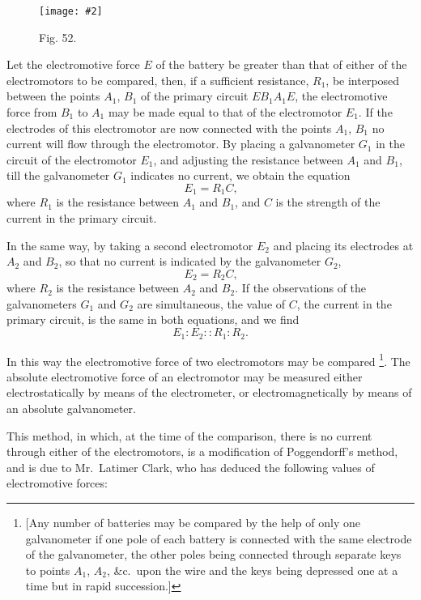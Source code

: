 \documentclass[12pt,oneside]{book}[2021/10/04]
\let\oldfootnote\footnote
\renewcommand\footnote[1]{%
\oldfootnote{\hspace{0.14em}#1}}
\newcommand{\Runhead}[1]{\fancyhead[C]{\iffloatpage{}{\small#1}}}
\newcommand{\widefig}[3]{
\begin{figure}[ht!]
\centering
\texttt{[image: \#2]}
\caption*{\small #3}
\end{figure}}
\newcommand{\¬}{\hphantom{0}}
\begin{document}
\widefig{0.51}{213.png}{Fig. 52.}
Let the electromotive force \(E\) of the battery be greater than that
of either of the electromotors to be compared, then, if a sufficient
resistance, \(R_1\), be interposed between the points \(A_1\), \(B_1\) of the
primary circuit \(EB_1A_1E\), the electromotive force from \(B_1\) to \(A_1\)
may be made equal to that of the electromotor \(E_1\). If the electrodes
of this electromotor are now connected with the points
\(A_1\), \(B_1\) no current will flow through the electromotor. By placing
a galvanometer \(G_1\) in the circuit of the electromotor \(E_1\), and
adjusting the resistance between \(A_1\) and \(B_1\), till the galvanometer
\(G_1\) indicates no current, we obtain the equation
\[
  E_1 = R_1C\text{,}
\]
where \(R_1\) is the resistance between \(A_1\) and \(B_1\), and \(C\) is the strength
of the current in the primary circuit.

In the same way, by taking a second electromotor \(E_2\) and placing
its electrodes at \(A_2\) and \(B_2\), so that no current is indicated by the
galvanometer \(G_2\),
\[
  E_2 = R_2C\text{,}
\]
where \(R_2\) is the resistance between \(A_2\) and \(B_2\). If the observations
of the galvanometers \(G_1\) and \(G_2\) are simultaneous, the value of \(C\),
the current in the primary circuit, is the same in both equations,
and we find
\[
 E_1 : E_2 :: R_1 : R_2\text{.}
\]

In this way the electromotive force of two electromotors may be
compared\footnote{
[Any number of batteries may be compared by the help of only one galvanometer
if one pole of each battery is connected with the same electrode of the galvanometer,
the other poles being connected through separate keys to points \(A_1\), \(A_2\), \&c.\ upon
the wire and the keys being depressed one at a time but in rapid succession.]
}. The absolute electromotive force of an electromotor
may be measured either electrostatically by means of the electrometer,
or electromagnetically by means of an absolute galvanometer.

This method, in which, at the time of the comparison, there
is no current through either of the electromotors, is a modification
of Poggendorff's method, and is due to Mr.\ Latimer Clark, who
has deduced the following values of electromotive forces:
\Runhead{POGGENDORFF'S COMPENSATION METHOD.}
\end{document}
